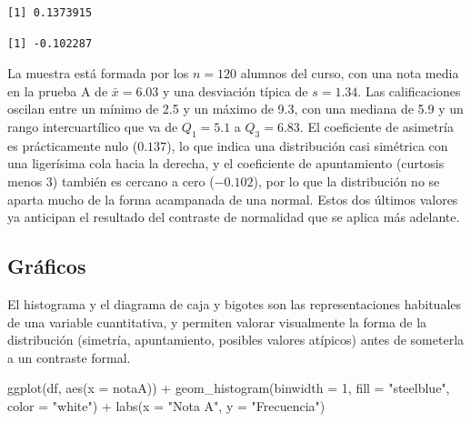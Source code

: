 \documentclass[
  spanish,
  a4paper,
]{scrreport}
\newenvironment{Shaded}{\begin{snugshade}}{\end{snugshade}}
\newcommand{\AttributeTok}[1]{\textcolor[rgb]{0.40,0.45,0.13}{#1}}
\newcommand{\DecValTok}[1]{\textcolor[rgb]{0.68,0.00,0.00}{#1}}
\newcommand{\FunctionTok}[1]{\textcolor[rgb]{0.28,0.35,0.67}{#1}}
\newcommand{\NormalTok}[1]{\textcolor[rgb]{0.00,0.23,0.31}{#1}}
\newcommand{\SpecialCharTok}[1]{\textcolor[rgb]{0.37,0.37,0.37}{#1}}
\newcommand{\StringTok}[1]{\textcolor[rgb]{0.13,0.47,0.30}{#1}}
\theoremstyle{definition}
\theoremstyle{definition}
\theoremstyle{remark}
\begin{document}
\begin{verbatim}
[1] 0.1373915
\end{verbatim}

\begin{Shaded}
\end{Shaded}

\begin{verbatim}
[1] -0.102287
\end{verbatim}

La muestra está formada por los \(n=120\) alumnos del curso, con una
nota media en la prueba A de \(\bar{x}=6.03\) y una desviación típica de
\(s=1.34\). Las calificaciones oscilan entre un mínimo de 2.5 y un
máximo de 9.3, con una mediana de 5.9 y un rango intercuartílico que va
de \(Q_1=5.1\) a \(Q_3=6.83\). El coeficiente de asimetría es
prácticamente nulo (\(0.137\)), lo que indica una distribución casi
simétrica con una ligerísima cola hacia la derecha, y el coeficiente de
apuntamiento (curtosis menos 3) también es cercano a cero (\(-0.102\)),
por lo que la distribución no se aparta mucho de la forma acampanada de
una normal. Estos dos últimos valores ya anticipan el resultado del
contraste de normalidad que se aplica más adelante.

\subsection{Gráficos}\label{gruxe1ficos}

El histograma y el diagrama de caja y bigotes son las representaciones
habituales de una variable cuantitativa, y permiten valorar visualmente
la forma de la distribución (simetría, apuntamiento, posibles valores
atípicos) antes de someterla a un contraste formal.

\begin{Shaded}
\begin{Highlighting}[]
\FunctionTok{ggplot}\NormalTok{(df, }\FunctionTok{aes}\NormalTok{(}\AttributeTok{x =}\NormalTok{ notaA)) }\SpecialCharTok{+}
  \FunctionTok{geom\_histogram}\NormalTok{(}\AttributeTok{binwidth =} \DecValTok{1}\NormalTok{, }\AttributeTok{fill =} \StringTok{"steelblue"}\NormalTok{, }\AttributeTok{color =} \StringTok{"white"}\NormalTok{) }\SpecialCharTok{+}
  \FunctionTok{labs}\NormalTok{(}\AttributeTok{x =} \StringTok{"Nota A"}\NormalTok{, }\AttributeTok{y =} \StringTok{"Frecuencia"}\NormalTok{)}
\end{Highlighting}
\end{Shaded}
\end{document}
